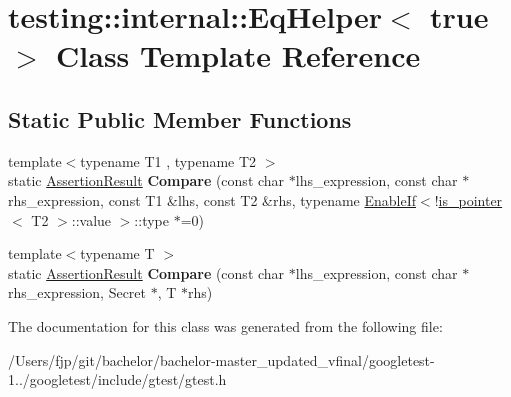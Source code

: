 \hypertarget{classtesting_1_1internal_1_1_eq_helper_3_01true_01_4}{}\section{testing\+:\+:internal\+:\+:Eq\+Helper$<$ true $>$ Class Template Reference}
\label{classtesting_1_1internal_1_1_eq_helper_3_01true_01_4}
\subsection*{Static Public Member Functions}
\begin{DoxyCompactItemize}
\item 
\mbox{\label{classtesting_1_1internal_1_1_eq_helper_3_01true_01_4_a12c7194b2a210b61f06c912eef484ca6}} 
{\footnotesize template$<$typename T1 , typename T2 $>$ }\\static \mbox{\hyperlink{classtesting_1_1_assertion_result}{Assertion\+Result}} {\bfseries Compare} (const char $\ast$lhs\+\_\+expression, const char $\ast$rhs\+\_\+expression, const T1 \&lhs, const T2 \&rhs, typename \mbox{\hyperlink{structtesting_1_1internal_1_1_enable_if}{Enable\+If}}$<$!\mbox{\hyperlink{structtesting_1_1internal_1_1is__pointer}{is\+\_\+pointer}}$<$ T2 $>$\+::value $>$\+::type $\ast$=0)
\item 
\mbox{\label{classtesting_1_1internal_1_1_eq_helper_3_01true_01_4_a6f292601a68c8f0d49e6d48bd309b900}} 
{\footnotesize template$<$typename T $>$ }\\static \mbox{\hyperlink{classtesting_1_1_assertion_result}{Assertion\+Result}} {\bfseries Compare} (const char $\ast$lhs\+\_\+expression, const char $\ast$rhs\+\_\+expression, Secret $\ast$, T $\ast$rhs)
\end{DoxyCompactItemize}


The documentation for this class was generated from the following file\+:\begin{DoxyCompactItemize}
\item 
/\+Users/fjp/git/bachelor/bachelor-\/master\+\_\+updated\+\_\+vfinal/googletest-\/1../googletest/include/gtest/gtest.\+h\end{DoxyCompactItemize}
